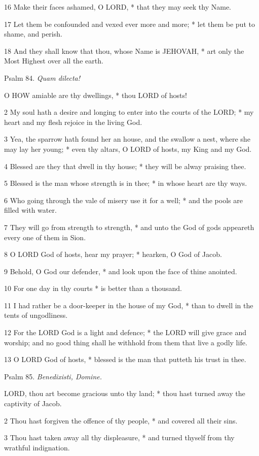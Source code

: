 16 Make their faces ashamed, O LORD, * that they may
seek thy Name.

17 Let them be confounded and vexed ever more and more;
* let them be put to shame, and perish.

18 And they shall know that thou, whose Name is JEHOVAH,
* art only the Most Highest over all the earth.

Psalm
84. \emph{Quam dilecta!}

O
HOW amiable are thy dwellings, * thou LORD of hosts!

2 My soul hath a desire and longing to enter into the
courts of the LORD; * my heart and my flesh rejoice in the living God.

3 Yea, the sparrow hath found her an house, and the
swallow a nest, where she may lay her young; * even thy altars, O LORD
of hosts, my King and my God.

4 Blessed are they that dwell in thy house; * they
will be alway praising thee.

5 Blessed is the man whose strength is in thee; * in
whose heart are thy ways.

6 Who going through the vale of misery use it for a
well; * and the pools are filled with water.

7 They will go from strength to strength, * and unto
the God of gods appeareth every one of them in Sion.

8 O LORD God of hosts, hear my prayer; * hearken, O
God of Jacob.

9 Behold, O God our defender, * and look upon the face
of thine anointed.

10 For one day in thy courts * is better than a thousand.

11 I had rather be a door-keeper in the house of my
God, * than to dwell in the tents of ungodliness.

12 For the LORD God is a light and defence; * the LORD
will give grace and worship; and no good thing shall he withhold from
them that live a godly life.

13 O LORD God of hosts, * blessed is the man that putteth
his trust in thee.

Psalm
85. \emph{Benedixisti, Domine.}

LORD,
thou art become gracious unto thy land; * thou hast turned away the captivity
of Jacob.

2 Thou hast forgiven the offence of thy people, * and
covered all their sins.

3 Thou hast taken away all thy displeasure, * and turned
thyself from thy wrathful indignation.

